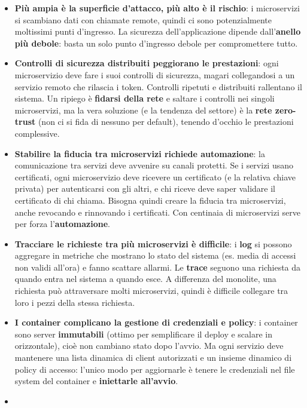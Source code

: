 \begin{itemize}
\tightlist
\item
  \textbf{Più ampia è la superficie d'attacco, più alto è il rischio}: i
  microservizi si scambiano dati con chiamate remote, quindi ci sono
  potenzialmente moltissimi punti d'ingresso. La sicurezza
  dell'applicazione dipende dall'\textbf{anello più debole}: basta un
  solo punto d'ingresso debole per compromettere tutto.
\item
  \textbf{Controlli di sicurezza distribuiti peggiorano le prestazioni}:
  ogni microservizio deve fare i suoi controlli di sicurezza, magari
  collegandosi a un servizio remoto che rilascia i token. Controlli
  ripetuti e distribuiti rallentano il sistema. Un ripiego è
  \textbf{fidarsi della rete} e saltare i controlli nei singoli
  microservizi, ma la vera soluzione (e la tendenza del settore) è la
  \textbf{rete zero-trust} (non ci si fida di nessuno per default),
  tenendo d'occhio le prestazioni complessive.
\item
  \textbf{Stabilire la fiducia tra microservizi richiede automazione}:
  la comunicazione tra servizi deve avvenire su canali protetti. Se i
  servizi usano certificati, ogni microservizio deve ricevere un
  certificato (e la relativa chiave privata) per autenticarsi con gli
  altri, e chi riceve deve saper validare il certificato di chi chiama.
  Bisogna quindi creare la fiducia tra microservizi, anche revocando e
  rinnovando i certificati. Con centinaia di microservizi serve per
  forza l'\textbf{automazione}.
\item
  \textbf{Tracciare le richieste tra più microservizi è difficile}: i
  \textbf{log} si possono aggregare in metriche che mostrano lo stato
  del sistema (es. media di accessi non validi all'ora) e fanno scattare
  allarmi. Le \textbf{trace} seguono una richiesta da quando entra nel
  sistema a quando esce. A differenza del monolite, una richiesta può
  attraversare molti microservizi, quindi è difficile collegare tra loro
  i pezzi della stessa richiesta.
\item
  \textbf{I container complicano la gestione di credenziali e policy}: i
  container sono server \textbf{immutabili} (ottimo per semplificare il
  deploy e scalare in orizzontale), cioè non cambiano stato dopo
  l'avvio. Ma ogni servizio deve mantenere una lista dinamica di client
  autorizzati e un insieme dinamico di policy di accesso: l'unico modo
  per aggiornarle è tenere le credenziali nel file system del container
  e \textbf{iniettarle all'avvio}.
\item

\end{itemize}
